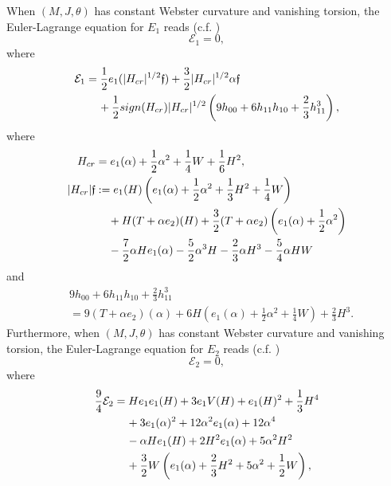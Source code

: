 \documentclass{amsart}
\theoremstyle{Corollary}
\numberwithin{equation}{section}
\begin{document}
When $(M,J,\theta)$ has constant Webster curvature and vanishing torsion, 
the Euler-Lagrange equation for $E_1$ reads (c.f. \cite[Theorem 3]{CYZ})
$$\mathcal{E}_1=0,$$
where 
\begin{equation}\label{EE_for_E1}
\begin{split}
\mathcal{E}_1&=\frac{1}{2}e_1(|H_{cr}|^{1/2}\mathfrak{f})+\frac{3}{2}|H_{cr}|^{1/2}\alpha\mathfrak{f}\\
&\hspace{4mm}+\frac{1}{2}sign(H_{cr})|H_{cr}|^{1/2}\left(9h_{00}+6h_{11}h_{10}+\frac{2}{3}h_{11}^3\right),
\end{split}
\end{equation}
where
\begin{equation}\label{0.1}
\begin{split}
H_{cr}&=e_1(\alpha)+\frac{1}{2}\alpha^2+\frac{1}{4}W+\frac{1}{6}H^2,\\
|H_{cr}|\mathfrak{f}&:=e_1(H)\left(e_1(\alpha)+\frac{1}{2}\alpha^2+\frac{1}{3}H^2+\frac{1}{4}W\right)\\
&\hspace{4mm}+H(T+\alpha e_2)(H)+\frac{3}{2}(T+\alpha e_2)\left(e_1(\alpha)+\frac{1}{2}\alpha^2\right)\\
&\hspace{4mm}-\frac{7}{2}\alpha H e_1(\alpha)-\frac{5}{2}\alpha^3 H-\frac{2}{3}\alpha H^3-\frac{5}{4}\alpha H W
\end{split}
\end{equation}
and 
\begin{equation}\label{0.2}
\begin{split}
&9h_{00}+6h_{11}h_{10}+\frac{2}{3}h_{11}^3\\
&=9(T+\alpha e_2)(\alpha)+6H\left(e_1(\alpha)+\frac{1}{2}\alpha^2+\frac{1}{4}W\right)
+\frac{2}{3}H^3. 
\end{split}
\end{equation}
Furthermore, when $(M,J,\theta)$ has constant Webster curvature and vanishing torsion, 
the Euler-Lagrange equation for $E_2$ reads (c.f. \cite[Theorem 8 and Theorem 9]{CYZ})
$$\mathcal{E}_2=0,$$
where
\begin{equation}\label{EE_for_E2}
\begin{split}
\frac{9}{4}\mathcal{E}_2&=H e_1e_1(H)+3 e_1 V(H)+e_1(H)^2+\frac{1}{3}H^4\\
&\hspace{4mm}+3 e_1(\alpha)^2+12\alpha^2 e_1(\alpha)+12\alpha^4\\
&\hspace{4mm}-\alpha H e_1(H)+2 H^2 e_1(\alpha)+5\alpha^2 H^2\\
&\hspace{4mm}+\frac{3}{2} W\left(e_1(\alpha)+\frac{2}{3}H^2+5\alpha^2+\frac{1}{2}W\right),
\end{split}
\end{equation}
\end{document}
